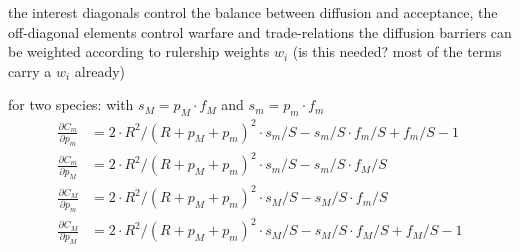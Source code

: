 \documentclass[12pt]{article}
\newcommand{\derive}[2]{\frac{\partial #1}{\partial #2}}
\begin{document}
the interest diagonals control the balance between diffusion and
acceptance, 
the off-diagonal elements control warfare and trade-relations
the diffusion barriers can be weighted according to rulership weights $w_i$ (is
this needed? most of the terms carry a $w_i$ already)

for two species: with $s_M = p_M \cdot f_M$ and $s_m = p_m \cdot f_m$
\begin{align}
\derive{C_m}{p_m} &= 2 \cdot R^2/(R+p_M+p_m)^2 \cdot s_m/S - s_m/S \cdot f_m/S + f_m/S - 1 \\
\derive{C_m}{p_M} &= 2 \cdot R^2/(R+p_M+p_m)^2 \cdot s_m/S - s_m/S \cdot f_M/S \\
\derive{C_M}{p_m} &= 2 \cdot R^2/(R+p_M+p_m)^2 \cdot s_M/S - s_M/S \cdot f_m/S \\
\derive{C_M}{p_M} &= 2 \cdot R^2/(R+p_M+p_m)^2 \cdot s_M/S - s_M/S \cdot f_M/S + f_M/S - 1 \\
\end{align}


%
%  
%
%
%  
\end{document}
